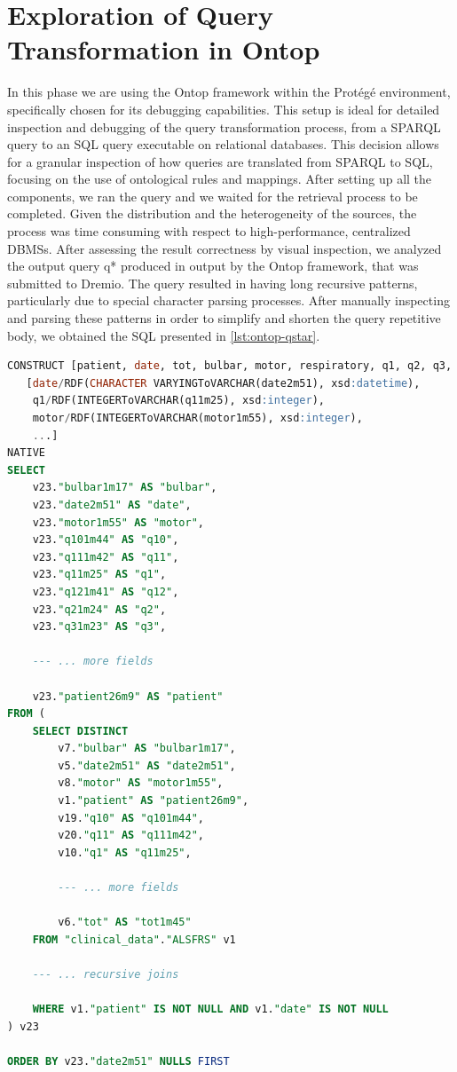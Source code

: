 \section{Exploration of Query Transformation in Ontop}
In this phase we are using the Ontop framework within the Protégé environment, specifically chosen for its debugging capabilities. This setup is ideal for detailed inspection and debugging of the query transformation process, from a \ac{SPARQL} query to an \ac{SQL} query executable on relational databases. This decision allows for a granular inspection of how queries are translated from \ac{SPARQL} to \ac{SQL}, focusing on the use of ontological rules and mappings. 
After setting up all the components, we ran the query and we waited for the retrieval process to be completed. Given the distribution and the heterogeneity of the sources, the process was time consuming with respect to high-performance, centralized \ac{DBMS}s. After assessing the result correctness by visual inspection, we analyzed the output query q* produced in output by the Ontop framework, that was submitted to Dremio.
The query resulted in having long recursive patterns, particularly due to special character parsing processes.
After manually inspecting and parsing these patterns in order to simplify and shorten the query repetitive body, we obtained the \ac{SQL} presented in \ref{lst:ontop-qstar}.
\begin{lstlisting}[language=SQL, caption={Parsed \ac{SQL} Translation of the Original \ac{SPARQL} Query}, label={lst:ontop-qstar}]
CONSTRUCT [patient, date, tot, bulbar, motor, respiratory, q1, q2, q3, q4, q5, q6, q7, q8, q9, q10, q11, q12]
   [date/RDF(CHARACTER VARYINGToVARCHAR(date2m51), xsd:datetime),
    q1/RDF(INTEGERToVARCHAR(q11m25), xsd:integer),
    motor/RDF(INTEGERToVARCHAR(motor1m55), xsd:integer),
    ...]
NATIVE
SELECT
    v23."bulbar1m17" AS "bulbar",
    v23."date2m51" AS "date",
    v23."motor1m55" AS "motor",
    v23."q101m44" AS "q10",
    v23."q111m42" AS "q11",
    v23."q11m25" AS "q1",
    v23."q121m41" AS "q12",
    v23."q21m24" AS "q2",
    v23."q31m23" AS "q3",

    --- ... more fields

    v23."patient26m9" AS "patient"
FROM (
    SELECT DISTINCT
        v7."bulbar" AS "bulbar1m17",
        v5."date2m51" AS "date2m51",
        v8."motor" AS "motor1m55",
        v1."patient" AS "patient26m9",
        v19."q10" AS "q101m44",
        v20."q11" AS "q111m42",
        v10."q1" AS "q11m25",

        --- ... more fields
        
        v6."tot" AS "tot1m45"
    FROM "clinical_data"."ALSFRS" v1
    
    --- ... recursive joins

    WHERE v1."patient" IS NOT NULL AND v1."date" IS NOT NULL
) v23

ORDER BY v23."date2m51" NULLS FIRST
\end{lstlisting}
